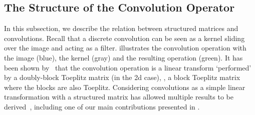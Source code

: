 \subsection{The Structure of the Convolution Operator}
\label{subsection:ch2-the_structure_of_the_convolution_operator}



In this subsection, we describe the relation between structured matrices and convolutions.
Recall that a discrete convolution can be seen as a kernel sliding over the image and acting as a filter.
 illustrates the convolution operation with the image (blue), the kernel (gray) and the resulting operation (green).
It has been shown by~\citet{jain1989fundamentals} that the convolution operation is a linear transform `performed' by a doubly-block Toeplitz matrix (in the 2d case), \ie, a block Toeplitz matrix where the blocks are also Toeplitz.
Considering convolutions as a simple linear transformation with a structured matrix has allowed multiple results to be derived~\citet{appuswamy2016structured,wang2020orthogonal,sedghi2018singular,singla2019bounding}, including one of our main contributions presented in .


